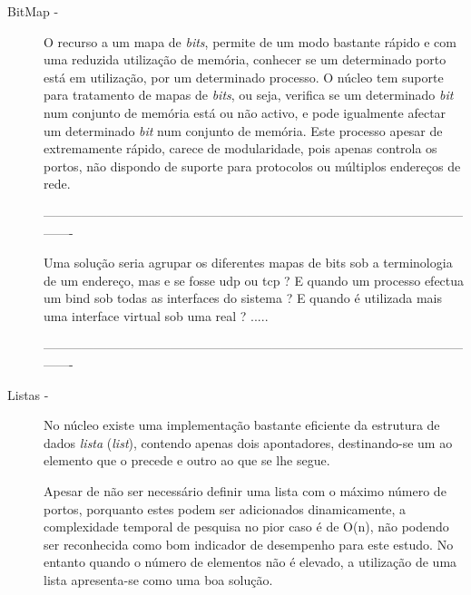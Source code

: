 \begin{description}

\item[BitMap - ]

O recurso a um mapa de \textit{bits}, permite de um modo bastante rápido e com uma reduzida utilização de memória, conhecer se um determinado porto está em utilização, por um determinado processo.
O núcleo tem suporte para tratamento de mapas de \textit{bits}, ou seja, verifica se um determinado \textit{bit} num conjunto de memória está ou não activo, e pode igualmente afectar um determinado \textit{bit} num conjunto de memória.
Este processo apesar de extremamente rápido, carece de modularidade, pois apenas controla os portos, não dispondo de suporte para protocolos ou múltiplos endereços de rede.
 
----------------------------------------------------------------------------------------------------------

Uma solução seria agrupar os diferentes mapas de bits sob a terminologia de um endereço, mas e se fosse udp ou tcp ?
E quando um processo efectua um bind sob todas as interfaces do sistema ? 
E quando é utilizada mais uma interface virtual sob uma real ? .....

----------------------------------------------------------------------------------------------------------

\item[Listas - ]

No núcleo existe uma implementação bastante eficiente da estrutura de dados \emph{lista} (\emph{list}), contendo apenas dois apontadores, destinando-se um ao elemento que o precede e outro ao que se lhe segue.

Apesar de não ser necessário definir uma lista com o máximo número de portos, porquanto estes podem ser adicionados dinamicamente, a complexidade temporal de pesquisa no pior caso é de O(n), não podendo ser reconhecida como bom indicador de desempenho para este estudo.
No entanto quando o número de elementos não é elevado, a utilização de uma lista apresenta-se como uma boa solução.



\end{description}
